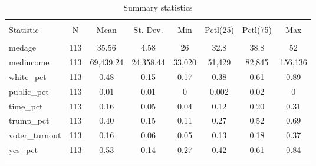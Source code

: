 \documentclass[
]{article}
\newenvironment{Shaded}{\begin{snugshade}}{\end{snugshade}}
\newcommand{\DataTypeTok}[1]{\textcolor[rgb]{0.13,0.29,0.53}{#1}}
\newcommand{\DecValTok}[1]{\textcolor[rgb]{0.00,0.00,0.81}{#1}}
\newcommand{\FloatTok}[1]{\textcolor[rgb]{0.00,0.00,0.81}{#1}}
\newcommand{\KeywordTok}[1]{\textcolor[rgb]{0.13,0.29,0.53}{\textbf{#1}}}
\newcommand{\NormalTok}[1]{#1}
\newcommand{\OperatorTok}[1]{\textcolor[rgb]{0.81,0.36,0.00}{\textbf{#1}}}
\newcommand{\StringTok}[1]{\textcolor[rgb]{0.31,0.60,0.02}{#1}}
\begin{document}
\begin{table}[!htbp] \centering 
  \caption{Summary statistics} 
  \label{summaryStats} 
\begin{tabular}{@{\extracolsep{5pt}}lccccccc} 
\\[-1.8ex]\hline 
\hline \\[-1.8ex] 
Statistic & \multicolumn{1}{c}{N} & \multicolumn{1}{c}{Mean} & \multicolumn{1}{c}{St. Dev.} & \multicolumn{1}{c}{Min} & \multicolumn{1}{c}{Pctl(25)} & \multicolumn{1}{c}{Pctl(75)} & \multicolumn{1}{c}{Max} \\ 
\hline \\[-1.8ex] 
medage & 113 & 35.56 & 4.58 & 26 & 32.8 & 38.8 & 52 \\ 
medincome & 113 & 69,439.24 & 24,358.44 & 33,020 & 51,429 & 82,845 & 156,136 \\ 
white\_pct & 113 & 0.48 & 0.15 & 0.17 & 0.38 & 0.61 & 0.89 \\ 
public\_pct & 113 & 0.01 & 0.01 & 0 & 0.002 & 0.02 & 0 \\ 
time\_pct & 113 & 0.16 & 0.05 & 0.04 & 0.12 & 0.20 & 0.31 \\ 
trump\_pct & 113 & 0.40 & 0.15 & 0.11 & 0.27 & 0.52 & 0.69 \\ 
voter\_turnout & 113 & 0.16 & 0.06 & 0.05 & 0.13 & 0.18 & 0.37 \\ 
yes\_pct & 113 & 0.53 & 0.14 & 0.27 & 0.42 & 0.61 & 0.84 \\ 
\hline \\[-1.8ex] 
\end{tabular} 
\end{table}

\begin{Shaded}
\end{Shaded}
\end{document}
